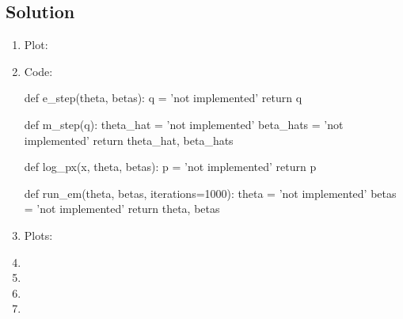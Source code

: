 \documentclass[submit]{harvardml}
\begin{document}
\subsection*{Solution}

\begin{enumerate}
  \item Plot:
  
  \item 
Code:

    \begin{python}
def e_step(theta, betas):
    q = 'not implemented'
    return q


def m_step(q):
    theta_hat = 'not implemented'
    beta_hats = 'not implemented'
    return theta_hat, beta_hats


def log_px(x, theta, betas):
    p = 'not implemented'
    return p


def run_em(theta, betas, iterations=1000):
    theta = 'not implemented'
    betas = 'not implemented'
    return theta, betas
    \end{python}
  \item Plots:
  \item 
  \item 
  \item 
  \item

\end{enumerate}


\newpage
  
\end{document}
